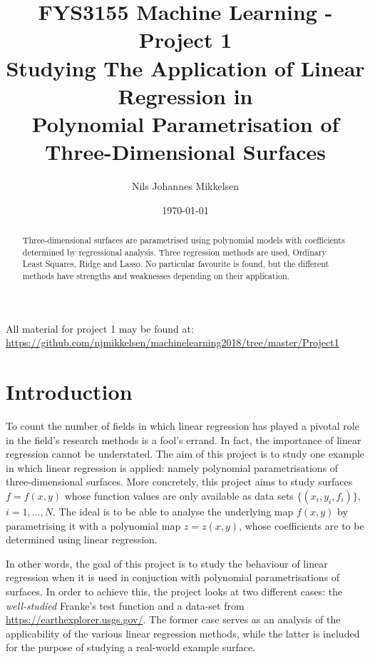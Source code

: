 \documentclass[reprint,english]{revtex4-1}
\begin{document}
\title{FYS3155 Machine Learning - Project 1\\Studying The Application of Linear Regression in\\Polynomial Parametrisation of Three-Dimensional Surfaces}
\author{Nils Johannes Mikkelsen}
\date{\today}
\noaffiliation
\begin{abstract}
Three-dimensional surfaces are parametrised using polynomial models with coefficients determined by regressional analysis. Three regression methods are used, Ordinary Least Squares, Ridge and Lasso. No particular favourite is found, but the different methods have strengths and weaknesses depending on their application.
\end{abstract}
\maketitle

All material for project 1 may be found at:\\
{\small\url{https://github.com/njmikkelsen/machinelearning2018/tree/master/Project1}}

\section{Introduction}
To count the number of fields in which linear regression has played a pivotal role in the field's research methods is a fool's errand. In fact, the importance of linear regression cannot be understated. The aim of this project is to study one example in which linear regression is applied: namely polynomial parametrisations of three-dimensional surfaces. More concretely, this project aims to study surfaces \(f=f(x,y)\) whose function values are only available as data sets \(\{(x_i,y_i,f_i)\}\), \(i=1,\ldots,N\). The ideal is to be able to analyse the underlying map \(f(x,y)\) by parametrising it with a polynomial map \(z=z(x,y)\), whose coefficients are to be determined using linear regression.

In other words, the goal of this project is to study the behaviour of linear regression when it is used in conjuction with polynomial parametrisations of surfaces. In order to achieve this, the project looks at two different cases: the \emph{well-studied} Franke's test function and a data-set from \url{https://earthexplorer.usgs.gov/}. The former case serves as an analysis of the applicability of the various linear regression methods, while the latter is included for the purpose of studying a real-world example surface.
\end{document}
